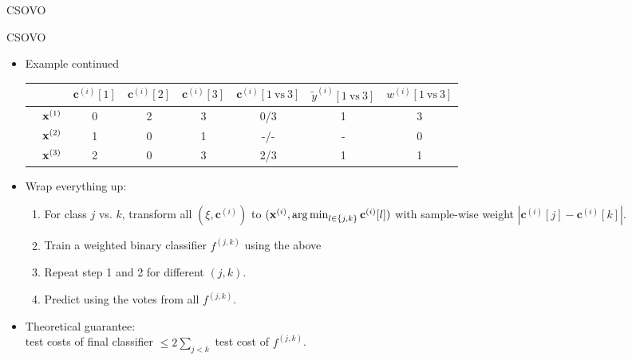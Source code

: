 \documentclass[11pt,compress,t,notes=noshow, xcolor=table]{beamer}
\newcommand{\cv}{\mathbf{c}}
\begin{document}
\begin{vbframe}{CSOVO}
\begin{itemize}
    \end{itemize}
\end{vbframe}


\begin{vbframe}{CSOVO}
    \begin{itemize}
    \item Example continued
    \begin{center}  
        \footnotesize{
            \begin{tabular}{cc|ccc|ccc}
                & & $\cv^{(i)}[1]$ & $\cv^{(i)}[2]$ & $\cv^{(i)}[3]$ & $\cv^{(i)}[1 \ \text{vs} \ 3]$ & $\tilde{y}^{( i)}[1 \ \text{vs} \ 3]$ & $w^{(i)}[1 \ \text{vs} \ 3]$\\
                \hline & $\mathbf{x}^{(1)}$ & 0 & 2 & 3 & 0/3 & 1 & 3\\
                & $\mathbf{x}^{(2)}$ & 1 & 0 & 1 & -/- & - & 0 \\
                & $\mathbf{x}^{(3)}$ & 2 & 0 & 3 & 2/3 & 1 & 1\\
            \end{tabular}
        }
    \end{center}

    \item Wrap everything up:
    \begin{enumerate}
        \item For class $j$ vs. $k$, transform all $(\xi, \cv^{(i)})$ to $(\xi, \argmin_{l \in \{j, k\}} \cv^{(i)}[l])$ with sample-wise weight $|\cv^{(i)}[j] - \cv^{(i)}[k]|$.
        
        \item Train a weighted binary classifier $f^{(j, k)}$ using the above
        
        \item Repeat step 1 and 2 for different $(j, k)$.
        
        \item Predict using the votes from all $f^{(j, k)}$.
    \end{enumerate}

    \item Theoretical guarantee:\\ 
    test costs of final classifier $\leq 2\sum_{j < k}$ test cost of $f^{(j, k)}$. 
    \end{itemize}
\end{vbframe}
\end{document}

